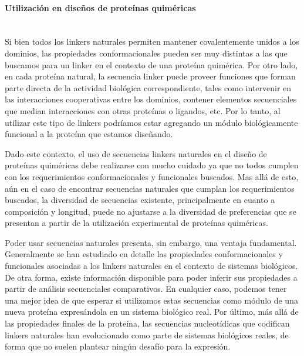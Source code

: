 \paragraph{Utilización en diseños de proteínas quiméricas} \hspace{0pt} \\ \indent 
Si bien todos los linkers naturales permiten mantener covalentemente unidos a los dominios, 
las propiedades conformacionales pueden ser muy distintas a las que buscamos para un linker en el contexto de una proteína quimérica.
Por otro lado, en cada proteína natural, la secuencia linker puede proveer funciones que forman parte directa de la actividad biológica correspondiente, 
tales como intervenir en las interacciones cooperativas entre los dominios, contener elementos secuenciales que median interacciones con otras proteínas o ligandos, etc.
Por lo tanto, al utilizar este tipo de linkers podríamos estar agregando un módulo biológicamente funcional a la proteína que estamos diseñando.

Dado este contexto, el uso de secuencias linkers naturales en el diseño de proteínas quiméricas debe realizarse con mucho cuidado ya que no todos cumplen con los requerimientos conformacionales y funcionales buscados.
Mas allá de esto, aún en el caso de encontrar secuencias naturales que cumplan los requerimientos buscados, la diversidad de secuencias existente, principalmente en cuanto a composición y longitud, puede no ajustarse a la diversidad de 
preferencias que se presentan a partir de la utilización experimental de proteínas quiméricas. %

Poder usar secuencias naturales presenta, sin embargo, una ventaja fundamental. 
Generalmente se han estudiado en detalle las propiedades conformacionales y funcionales asociadas a los linkers naturales en el contexto de sistemas biológicos.
De otra forma, existe información disponible para poder inferir sus propiedades a partir de análisis secuenciales comparativos. 
En cualquier caso, podemos tener una mejor idea de que esperar si utilizamos estas secuencias como módulo de una nueva proteína expresándola en un sistema biológico real.
Por último, más allá de las propiedades finales de la proteína, las secuencias nucleotídicas que codifican linkers naturales han evolucionado como parte de sistemas biológicos reales,
de forma que no suelen plantear ningún desafío para la expresión.














